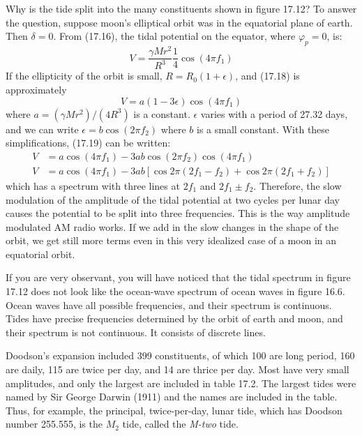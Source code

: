 Why is the tide split into the many constituents shown in figure 17.12? To answer the question,
suppose moon's elliptical orbit was in the equatorial plane of earth. Then $\delta = 0$. From
(17.16), the tidal potential on the equator, where
$\varphi_p =0$, is:
\begin{equation}
V = \frac{\gamma M r^{2}}{R^{3}} \frac{1}{4} \cos \left(4 \pi f_1 \right)
\end{equation}
If the ellipticity of the orbit is small, $R= R_0 (1+\epsilon )$, and (17.18) is
approximately
\begin{equation}
V = a (1-3\epsilon) \cos \left(4 \pi f_1 \right)
\end{equation}
where $a=\left( \gamma M r^2 \right)/\left( 4 R^3 \right)$ is a constant.
$\epsilon$ varies with a period of 27.32 days, and we can write $\epsilon = b \cos
(2 \pi f_2)$ where $b$ is a small constant. With these simplifications, (17.19)
can be written:
\begin{subequations}
\begin{align}
V &= a \cos \left(4 \pi f_1 \right) -3 a b \cos \left( 2 \pi f_2 \right) \cos \left(4 \pi f_1 \right) \\
V &= a \cos \left(4\pi f_1 \right) - 3 a b \left[ \cos 2\pi \left( 2f_1 - f_2 \right) + \cos 2\pi \left( 2f_1 + f_2 \right) \right]
\end{align}
\end{subequations}
which has a spectrum with three lines at $2 f_1$ and $ 2 f_1 \pm f_2$. Therefore,
the slow modulation of the amplitude of the tidal potential at two cycles per
lunar day causes the potential to be split into three frequencies. This is the
way amplitude modulated AM radio works. If we add in the slow changes in
the shape of the orbit, we get still more terms even in this very idealized case
of a moon in an equatorial orbit.

If you are very observant, you will have noticed that the tidal spectrum in figure 17.12 does
not look like the ocean-wave spectrum of ocean waves in figure 16.6. Ocean waves have all
possible frequencies, and their spectrum is continuous. Tides have precise frequencies
determined by the orbit of earth and moon, and their spectrum is not continuous. It consists
of discrete lines.

Doodson's expansion included 399 constituents, of which 100 are long period, 160
are daily, 115 are twice per day, and 14 are thrice per day. Most have very small
amplitudes, and only the largest are included in table 17.2. The largest tides
were named by Sir George Darwin (1911) and the names are included in the table.
Thus, for example, the principal, twice-per-day, lunar tide, which has Doodson
number 255.555, is the $M_2$ tide, called the \textit{M-two} tide.


